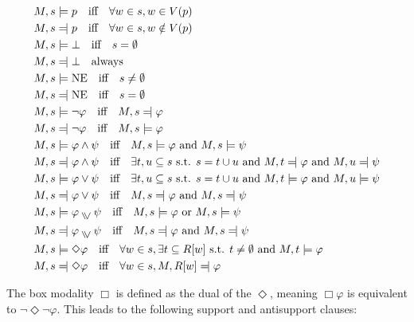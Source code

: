 \begin{align*}
M, s &\models p \quad \text{iff} \quad \forall w \in s, w \in V(p) \\
M, s &\leftmodels p \quad \text{iff} \quad \forall w \in s, w \notin V(p) \\
M, s &\models \bot \quad \text{iff} \quad s = \emptyset \\
M, s &\leftmodels \bot \quad \text{always} \\
M, s &\models \text{NE} \quad \text{iff} \quad s \neq \emptyset \\
M, s &\leftmodels  \text{NE} \quad \text{iff} \quad s = \emptyset \\
M, s &\models \neg \varphi \quad \text{iff} \quad M, s \leftmodels \varphi \\
M, s &\leftmodels  \neg \varphi \quad \text{iff} \quad M, s \models \varphi \\
M, s &\models \varphi \land \psi \quad \text{iff} \quad M, s \models \varphi \text{ and } M, s \models \psi \\
M, s &\leftmodels  \varphi \land \psi \quad \text{iff} \quad \exists t, u \subseteq s \text{ s.t. } s = t \cup u \text{ and } M, t \leftmodels \varphi \text{ and } M, u \leftmodels \psi \\
M, s &\models \varphi \lor \psi \quad \text{iff} \quad \exists t, u \subseteq s \text{ s.t. } s = t \cup u \text{ and } M, t \models \varphi \text{ and } M, u \models \psi \\
M, s &\leftmodels \varphi \lor \psi \quad \text{iff} \quad M, s \leftmodels \varphi \text{ and } M, s \leftmodels \psi \\
M, s &\models \varphi \inqdisj \psi \quad \text{iff} \quad M, s \models \varphi \text{ or } M, s \models \psi \\
M, s &\leftmodels \varphi \inqdisj \psi \quad \text{iff} \quad M, s \leftmodels\varphi \text{ and } M, s \leftmodels \psi\\
M, s &\models \Diamond \varphi \quad \text{iff} \quad \forall w \in s, \exists t \subseteq R[w] \text{ s.t. } t \neq \emptyset \text{ and } M, t \models \varphi \\
M, s &\leftmodels  \Diamond \varphi \quad \text{iff} \quad \forall w \in s, M, R[w] \leftmodels \varphi
\end{align*}

The box modality \(\Box\) is defined as the dual of the \(\Diamond\), meaning \(\Box \varphi\) is equivalent to \(\neg \Diamond \neg \varphi\). This leads to the following support and antisupport clauses:

